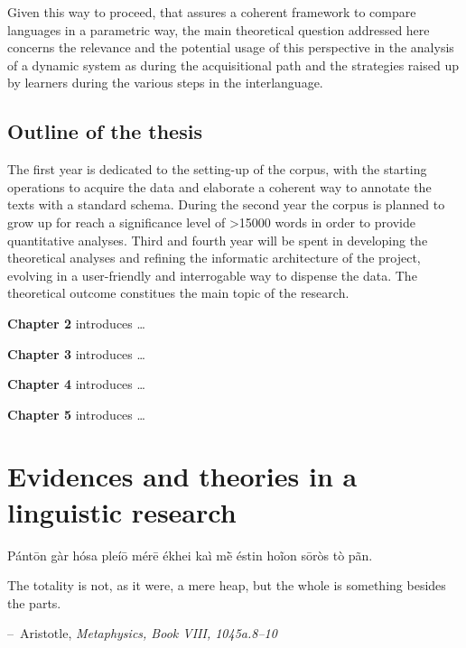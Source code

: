 \documentclass[a4paper,twoside,12pt,chapterprefix=false,bibliography=totocnumbered,listof=flat]{scrbook}
\makeatletter
\newenvironment{chapquote}[2][2em]
  {\setlength{\@tempdima}{#1}%
   \def\chapquote@author{#2}%
   \parshape 1 \@tempdima \dimexpr\textwidth-2\@tempdima\relax%
   \itshape}
  {\par\normalfont\hfill--\ \chapquote@author\hspace*{\@tempdima}\par\vspace{4em}}
\makeatother
\begin{document}
Given this way to proceed, that assures a coherent framework to compare
languages in a parametric way, the main theoretical question addressed
here concerns the relevance and the potential usage of this perspective
in the analysis of a dynamic system as during the acquisitional path and
the strategies raised up by learners during the various steps in the
interlanguage.

\section{Outline of the thesis}\label{outline-of-the-thesis}

The first year is dedicated to the setting-up of the corpus, with the
starting operations to acquire the data and elaborate a coherent way to
annotate the texts with a standard schema. During the second year the
corpus is planned to grow up for reach a significance level of
\textgreater{}15000 words in order to provide quantitative analyses.
Third and fourth year will be spent in developing the theoretical
analyses and refining the informatic architecture of the project,
evolving in a user-friendly and interrogable way to dispense the data.
The theoretical outcome constitues the main topic of the research.

\textbf{Chapter 2} introduces \ldots{}

\textbf{Chapter 3} introduces \ldots{}

\textbf{Chapter 4} introduces \ldots{}

\textbf{Chapter 5} introduces \ldots{}

\chapter{Evidences and theories in a linguistic
research}\label{evidences-and-theories-in-a-linguistic-research}

\begin{chapquote}{Aristotle, \textit{Metaphysics, Book VIII, 1045a.8–10}}
\par{Pántōn gàr hósa pleíō mérē ékhei kaì mḕ éstin hoĩon sōròs tò pãn.}\\ 
\par{\noindent The totality is not, as it were, a mere heap, but the whole is something besides the parts.}
\end{chapquote}
\end{document}
